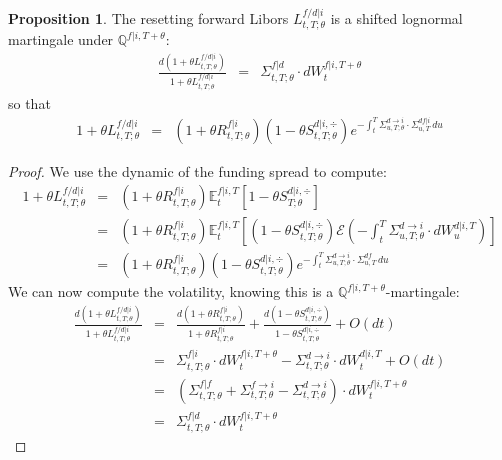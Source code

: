 \documentclass[11pt,english]{amsart}
\newcommand{\EE}{\mathbb{E}}
\newcommand{\QQ}{\mathbb{Q}}
\theoremstyle{definition}
\newtheorem{prop}{Proposition}
\begin{document}
\begin{prop}
The resetting forward Libors $L^{f/d|i}_{t,T;\theta}$ is a shifted lognormal martingale under $\QQ^{f|i,T+\theta}$:
\begin{eqnarray}
   \frac{d(1 + \theta L^{f/d|i}_{t,T;\theta})}{1 + \theta L^{f/d|i}_{t,T;\theta}}
   &=& \Sigma^{f|d}_{t,T;\theta} \cdot dW^{f|i,T+\theta}_t 
\end{eqnarray} 
so that
\begin{eqnarray}
   1 + \theta L^{f/d|i}_{t,T;\theta} 
  &=& (1+\theta R^{f|i}_{t,T;\theta}) (1-\theta S^{d|i,\div}_{t,T;\theta}) e^{ - \int_t^T \Sigma^{d\to i}_{u,T;\theta} \cdot \Sigma^{df|i}_{u,T} \,du }  
\end{eqnarray} 
\end{prop}


\begin{proof}
We use the dynamic of the funding spread to compute:
\begin{eqnarray*}
   1 + \theta L^{f/d|i}_{t,T;\theta} 
   &=&  (1+\theta R^{f|i}_{t,T;\theta})  \EE^{f|i,T}_t\left[ 1-\theta S^{d|i,\div}_{T;\theta} \right]   \\
   &=& (1+\theta R^{f|i}_{t,T;\theta})  \EE^{f|i,T}_t\left[ (1-\theta S^{d|i,\div}_{t,T;\theta}) \mathcal{E}\left(- \int_t^T \Sigma^{d\to i}_{u,T;\theta} \cdot dW^{d|i,T}_u \right) \right]   \\
  &=& (1+\theta R^{f|i}_{t,T;\theta}) (1-\theta S^{d|i,\div}_{t,T;\theta}) e^{ - \int_t^T \Sigma^{d\to i}_{u,T;\theta} \cdot \Sigma^{df}_{u,T} \,du }  
\end{eqnarray*} 
We can now compute the volatility, knowing this is a $\QQ^{f|i,T+\theta}$-martingale:
\begin{eqnarray*}
    \frac{d(1 + \theta L^{f/d|i}_{t,T;\theta})}{1 + \theta L^{f/d|i}_{t,T;\theta} } 
   &=& \frac{d(1 + \theta R^{f|i}_{t,T;\theta})}{1 + \theta R^{f|i}_{t,T;\theta}} 
   +  \frac{d(1-\theta S^{d|i,\div}_{t,T;\theta})}{1-\theta S^{d|i,\div}_{t,T;\theta}} + O(dt) \\
   &=& \Sigma^{f|i}_{t,T;\theta} \cdot dW^{f|i,T+\theta}_t  -  \Sigma^{d\to i}_{t,T;\theta} \cdot dW^{d|i,T}_t  + O(dt) \\
   &=& \left( \Sigma^{f|f}_{t,T;\theta} + \Sigma^{f\to i}_{t,T;\theta} -   \Sigma^{d\to i}_{t,T;\theta}\right) \cdot dW^{f|i,T+\theta}_t  \\
   &=&  \Sigma^{f|d}_{t,T;\theta} \cdot dW^{f|i,T+\theta}_t  
\end{eqnarray*} 

\end{proof}
\end{document}
